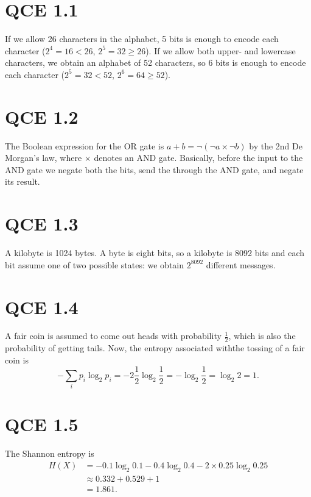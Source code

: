 \documentclass[10pt]{article}
\begin{document}
\section*{QCE 1.1}
If we allow 26 characters in the alphabet, 5 bits is enough to encode each character ($2^4 = 16 < 26$, $2^5 = 32 \geq 26$).
If we allow both upper- and lowercase characters, we obtain an alphabet of 52 characters, so 6 bits is enough to encode each character ($2^5 = 32 < 52$, $2^6 = 64 \geq 52$).

\section*{QCE 1.2} The Boolean expression for the OR gate is $a + b = \neg (\neg a \times \neg b)$ by the 2nd De Morgan's law, where $\times$ denotes an AND gate. Basically, before the input to the AND gate we negate both the bits, send the through the AND gate, and negate its result.

\section*{QCE 1.3} A kilobyte is 1024 bytes. A byte is eight bits, so a kilobyte is 8092 bits and each bit assume one of two possible states: we obtain $2^{8092}$ different messages.

\section*{QCE 1.4} A fair coin is assumed to come out heads with probability $\frac{1}{2}$, which is also the probability of getting tails. Now, the entropy associated withthe tossing of a fair coin is 
\[
-\sum_i p_i \log_2 p_i = -2 \frac{1}{2} \log_2 \frac{1}{2} = -\log_2 \frac{1}{2} = \log_2 2 = 1.
\]

\section*{QCE 1.5}
The Shannon entropy is 
\begin{align*}
H(X) &= -0.1 \log_2 0.1 - 0.4 \log_2 0.4 - 2 \times 0.25 \log_2 0.25 \\
       &\approx 0.332 + 0.529 + 1 \\
       &= 1.861.
\end{align*}
\end{document}
